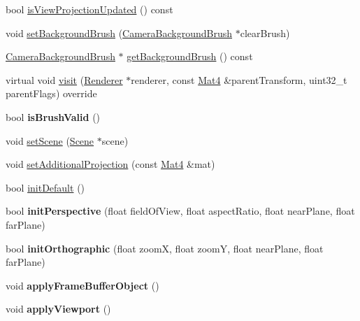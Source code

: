 \begin{DoxyCompactItemize}
\item 
bool \hyperlink{classCamera_afba312d6b30f3d137e9c173f7fa334e6}{is\+View\+Projection\+Updated} () const
\item 
void \hyperlink{classCamera_a1804790d419a1d952752f81680d98d1f}{set\+Background\+Brush} (\hyperlink{classCameraBackgroundBrush}{Camera\+Background\+Brush} $\ast$clear\+Brush)
\item 
\hyperlink{classCameraBackgroundBrush}{Camera\+Background\+Brush} $\ast$ \hyperlink{classCamera_a7994f962fbded68295f7b15f3046bdd8}{get\+Background\+Brush} () const
\item 
virtual void \hyperlink{classCamera_a9af4106a5c83986160cb975d53205fce}{visit} (\hyperlink{classRenderer}{Renderer} $\ast$renderer, const \hyperlink{classMat4}{Mat4} \&parent\+Transform, uint32\+\_\+t parent\+Flags) override
\item 
\mbox{\label{classCamera_a3af85368441d5aa6a463ae20777065fd}} 
bool {\bfseries is\+Brush\+Valid} ()
\item 
void \hyperlink{classCamera_ac35b13397b0add2c502bef10a46f0e17}{set\+Scene} (\hyperlink{classScene}{Scene} $\ast$scene)
\item 
void \hyperlink{classCamera_ab3d0364f67e78080b9bacee82678c542}{set\+Additional\+Projection} (const \hyperlink{classMat4}{Mat4} \&mat)
\item 
bool \hyperlink{classCamera_a4bdc70b1156c5b4cbdb5706cb75fb598}{init\+Default} ()
\item 
\mbox{\label{classCamera_ad176536923ab1ca8276260f40cdac6e2}} 
bool {\bfseries init\+Perspective} (float field\+Of\+View, float aspect\+Ratio, float near\+Plane, float far\+Plane)
\item 
\mbox{\label{classCamera_ac68ab51e1a13d1e1d473a829d3633028}} 
bool {\bfseries init\+Orthographic} (float zoomX, float zoomY, float near\+Plane, float far\+Plane)
\item 
\mbox{\label{classCamera_a93b40b1f7c908321a7336455ec48091f}} 
void {\bfseries apply\+Frame\+Buffer\+Object} ()
\item 
\mbox{\label{classCamera_ac21c04a71fc49783b64c5e32f4f1d128}} 
void {\bfseries apply\+Viewport} ()
\item 
\mbox{\label{classCamera_a2a1f9bbd4929dc623430d3de6cf32eb1}} 

\end{DoxyCompactItemize}

